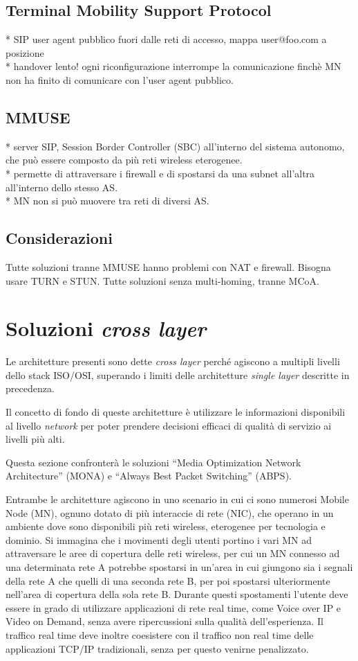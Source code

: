 \documentclass[12pt,a4paper,openright,twoside]{book}
\begin{document}
\subsection{Terminal Mobility Support Protocol}
* SIP user agent pubblico fuori dalle reti di accesso, mappa
  user@foo.com a posizione\\
* handover lento! ogni riconfigurazione interrompe la comunicazione
  finchè MN non ha finito di comunicare con l'user agent pubblico.

\subsection{MMUSE}
* server SIP, Session Border Controller (SBC) all'interno del
  sistema autonomo, che può essere composto da più reti wireless
  eterogenee.\\
* permette di attraversare i firewall e di spostarsi da una subnet
  all'altra all'interno dello stesso AS.\\
* MN non si può muovere tra reti di diversi AS.\\

\subsection{Considerazioni}
Tutte soluzioni tranne MMUSE hanno problemi con NAT e
firewall. Bisogna usare TURN e STUN. Tutte soluzioni senza
multi-homing, tranne MCoA.

\section{Soluzioni \emph{cross layer}}
Le architetture presenti sono dette \emph{cross layer} perché agiscono
a multipli livelli dello stack ISO/OSI, superando i limiti delle
architetture \emph{single layer} descritte in precedenza.

Il concetto di fondo di queste architetture è utilizzare le
informazioni disponibili al livello \emph{network} per poter prendere
decisioni efficaci di qualità di servizio ai livelli più alti.

Questa sezione confronterà le soluzioni ``Media Optimization Network
Architecture'' (MONA) e ``Always Best Packet Switching'' (ABPS).

Entrambe le architetture agiscono in uno scenario in cui ci sono
numerosi Mobile Node (MN), ognuno dotato di più interaccie di rete
(NIC), che operano in un ambiente dove sono disponibili più reti
wireless, eterogenee per tecnologia e dominio. Si immagina che i
movimenti degli utenti portino i vari MN ad attraversare le aree di
copertura delle reti wireless, per cui un MN connesso ad una
determinata rete A potrebbe spostarsi in un'area in cui giungono sia i
segnali della rete A che quelli di una seconda rete B, per poi
spostarsi ulteriormente nell'area di copertura della sola rete
B. Durante questi spostamenti l'utente deve essere in grado di
utilizzare applicazioni di rete real time, come Voice over IP e Video
on Demand, senza avere ripercussioni sulla qualità dell'esperienza. Il
traffico real time deve inoltre coesistere con il traffico non real
time delle applicazioni TCP/IP tradizionali, senza per questo venirne
penalizzato.
\end{document}
